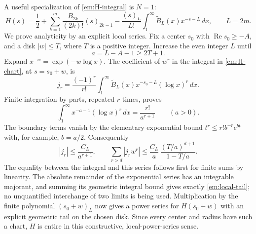 A useful specialization of \eqref{em:H-integral} is $N=1$:
\begin{equation}
 H(s)=\frac12+
   \sum_{k=1}^m\frac{B_{2k}}{(2k)!}(s)_{2k-1}
  -\frac{(s)_L}{L!}
        \int_1^\infty\widetilde B_L(x)x^{-s-L}\,dx,
 \qquad L=2m.
 \label{em:H-chart}
\end{equation}
We prove analyticity by an explicit local series.  Fix a center $s_0$
with $\operatorname{Re}s_0\geq-A$, and a disk $|w|\leq T$, where $T$
is a positive integer.  Increase the even integer $L$ until
\[
 a=L-A-1\geq2T+1.
\]
Expand $x^{-w}=\exp(-w\log x)$.  The coefficient of $w^r$ in the
integral in \eqref{em:H-chart}, at $s=s_0+w$, is
\begin{equation}
 j_r=\frac{(-1)^r}{r!}
       \int_1^\infty\widetilde B_L(x)
                     x^{-s_0-L}(\log x)^r\,dx.
 \label{em:local-coefficients}
\end{equation}
Finite integration by parts, repeated $r$ times, proves
\begin{equation}
 \int_1^\infty x^{-a-1}(\log x)^r\,dx
       =\frac{r!}{a^{r+1}}\qquad(a>0).
 \label{em:log-moment}
\end{equation}
The boundary terms vanish by the elementary exponential bound
$t^r\leq r!b^{-r}e^{bt}$ with, for example, $b=a/2$.
Consequently
\begin{equation}
 |j_r|\leq\frac{C_L}{a^{r+1}},\qquad
 \sum_{r>d}|j_rw^r|
 \leq\frac{C_L}{a}\,
          \frac{(T/a)^{d+1}}{1-T/a}.
 \label{em:local-tail}
\end{equation}
The equality between the integral and this series follows first for
finite sums by linearity.  The absolute remainder of the exponential
series has an integrable majorant, and summing its geometric integral
bound gives exactly \eqref{em:local-tail}; no unquantified interchange
of two limits is being used.  Multiplication by the finite polynomial
$(s_0+w)_L$ now gives a power series for $H(s_0+w)$ with an explicit
geometric tail on the chosen disk.  Since every center and radius have
such a chart, $H$ is entire in this constructive, local-power-series
sense.

